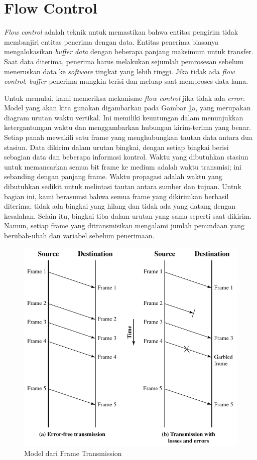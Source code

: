 \section{Flow Control}

\textit{Flow control} adalah teknik untuk memastikan bahwa entitas pengirim tidak membanjiri entitas penerima dengan data. Entitas penerima biasanya mengalokasikan \textit{buffer data} dengan beberapa panjang maksimum untuk transfer. Saat data diterima, penerima harus melakukan sejumlah pemrosesan sebelum meneruskan data ke \textit{software} tingkat yang lebih tinggi. Jika tidak ada \textit{flow control}, \textit{buffer} penerima mungkin terisi dan meluap saat memproses data lama.

Untuk memulai, kami memeriksa mekanisme \textit{flow control} jika tidak ada \textit{error}. Model yang akan kita gunakan digambarkan pada Gambar \ref{fig:07.01}a, yang merupakan diagram urutan waktu vertikal. Ini memiliki keuntungan dalam menunjukkan ketergantungan waktu dan menggambarkan hubungan kirim-terima yang benar. Setiap panah mewakili satu frame yang menghubungkan tautan data antara dua stasiun. Data dikirim dalam urutan bingkai, dengan setiap bingkai berisi sebagian data dan beberapa informasi kontrol. Waktu yang dibutuhkan stasiun untuk memancarkan semua bit frame ke medium adalah waktu transmisi; ini sebanding dengan panjang frame. Waktu propagasi adalah waktu yang dibutuhkan sedikit untuk melintasi tautan antara sumber dan tujuan. Untuk bagian ini, kami berasumsi bahwa semua frame yang dikirimkan berhasil diterima; tidak ada bingkai yang hilang dan tidak ada yang datang dengan kesalahan. Selain itu, bingkai tiba dalam urutan yang sama seperti saat dikirim. Namun, setiap frame yang ditransmisikan mengalami jumlah penundaan yang berubah-ubah dan variabel sebelum penerimaan.\footnotemark


\begin{figure}
	\centering
	\includegraphics[width=0.7\linewidth]{gambar/fig:07.01}
	\caption{Model dari Frame Transmission}
	\label{fig:07.01}
\end{figure}


